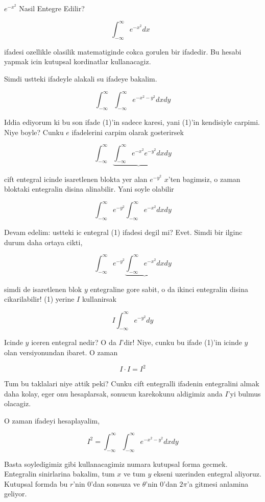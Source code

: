 \documentclass[12pt,fleqn]{article}
\begin{document}
$e^{-x^2}$ Nasil Entegre Edilir? 

\[ \int_{-\infty}^{\infty} e^{-x^2} dx \ \ \ \label{1} \]

ifadesi ozellikle olasilik matematiginde cokca gorulen bir ifadedir. Bu
hesabi yapmak icin kutupsal kordinatlar kullanacagiz. 

Simdi ustteki ifadeyle alakali su ifadeye bakalim. 

\[ \int_{-\infty}^{\infty} \int_{-\infty}^{\infty} e^{-x^2-y^2} dx dy \]

Iddia ediyorum ki bu son ifade (1)'in sadece karesi, yani (1)'in kendisiyle
carpimi. Niye boyle? Cunku $e$ ifadelerini carpim olarak gosterirsek

\[ \int_{-\infty}^{\infty} 
\underbrace{\int_{-\infty}^{\infty} e^{-x^2} e^{-y^2} dx}
dy \]

cift entegral icinde isaretlenen blokta yer alan $e^{-y^2}$ $x$'ten
bagimsiz, o zaman bloktaki entegralin disina alinabilir. Yani soyle olabilir

\[ \int_{-\infty}^{\infty} 
e^{-y^2} \int_{-\infty}^{\infty} e^{-x^2}  dx
dy \]

Devam edelim: ustteki ic entegral (1) ifadesi degil mi? Evet. Simdi bir
ilginc durum daha ortaya cikti, 

\[ \int_{-\infty}^{\infty}  e^{-y^2} 
\underbrace{\int_{-\infty}^{\infty} e^{-x^2}  dx}
dy \]

simdi de isaretlenen blok $y$ entegraline gore sabit, o da ikinci
entegralin disina cikarilabilir! (1) yerine $I$ kullanirsak 

\[ I \int_{-\infty}^{\infty}  e^{-y^2} dy \]

Icinde $y$ iceren entegral nedir? O da $I$'dir! Niye, cunku bu ifade 
(1)'in icinde $y$ olan versiyonundan ibaret. O zaman 

\[ I \cdot I = I^2 \]

Tum bu taklalari niye attik peki? Cunku cift entegralli ifadenin
entegralini almak daha kolay, eger onu hesaplarsak, sonucun karekokunu
aldigimiz anda $I$'yi bulmus olacagiz. 

O zaman ifadeyi hesaplayalim, 

\[ I^2 = \int_{-\infty}^{\infty} \int_{-\infty}^{\infty} e^{-x^2-y^2} dx dy \]

Basta soyledigimiz gibi kullanacagimiz numara kutupsal forma
gecmek. Entegralin sinirlarina bakalim, tum $x$ ve tum $y$ ekseni uzerinden
entegral aliyoruz. Kutupsal formda bu $r$'nin 0'dan sonsuza ve $\theta$'nin
0'dan $2\pi$'a gitmesi anlamina geliyor. 
\end{document}
